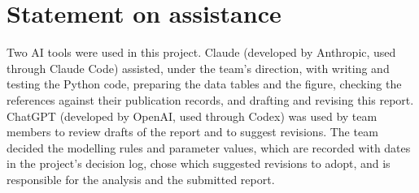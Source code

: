 
\section*{Statement on assistance}

Two AI tools were used in this project. Claude (developed by Anthropic, used through Claude Code) assisted, under the team's direction, with writing and testing the Python code, preparing the data tables and the figure, checking the references against their publication records, and drafting and revising this report. ChatGPT (developed by OpenAI, used through Codex) was used by team members to review drafts of the report and to suggest revisions. The team decided the modelling rules and parameter values, which are recorded with dates in the project's decision log, chose which suggested revisions to adopt, and is responsible for the analysis and the submitted report.
